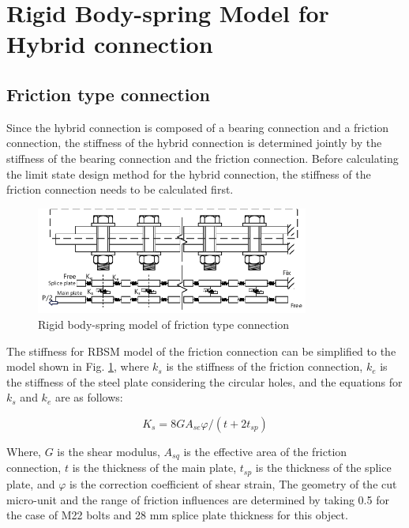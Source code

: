 \section{Rigid Body-spring Model for Hybrid connection}

\subsection{Friction type connection}

Since the hybrid connection is composed of a bearing connection and a friction connection, the stiffness of the hybrid connection is determined jointly by the stiffness of the bearing connection and the friction connection. Before calculating the limit state design method for the hybrid connection, the stiffness of the friction connection needs to be calculated first.

\begin{figure}[htbp]
    \centering
    \includegraphics[width=0.8\textwidth]{imgs/ch7/RBSM.pdf}
    \caption{Rigid body-spring model of friction type connection}
    \label{fig-rbsm}
\end{figure}

The stiffness for \ac{RBSM} model of the friction connection can be simplified to the model shown in Fig. \ref{fig-rbsm}, where $k_{s}$ is the stiffness of the friction connection, $k_{e}$ is the stiffness of the steel plate considering the circular holes, and the equations for $k_{s}$ and $k_{e}$ are as follows:

\begin{equation}\label{eq-ks}
    K_{s} = 8GA_{se} \varphi / (t + 2 t_{sp})
\end{equation}

Where, $G$ is the shear modulus, $A_{sq}$ is the effective area of the friction connection, $t$ is the thickness of the main plate, $t_{sp}$ is the thickness of the splice plate, and $\varphi$ is the correction coefficient of shear strain, The geometry of the cut micro-unit and the range of friction influences are determined by taking 0.5 for the case of M22 bolts and 28 mm splice plate thickness for this object.

